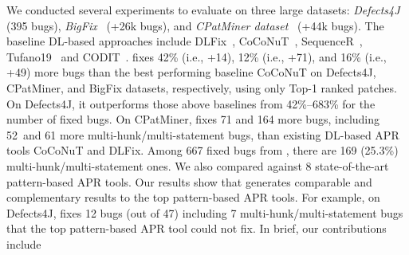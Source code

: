 
We conducted several experiments to evaluate {\tool} on three large
datasets: {\it Defects4J}~\cite{defects4j} (395 bugs), {\it
  BigFix}~\cite{icse20} (+26k bugs), and {\it CPatMiner
  dataset}~\cite{icse19-cpatminer} (+44k bugs). The baseline DL-based
approaches include DLFix~\cite{icse20},
CoCoNuT~\cite{lutellier2020coconut},
SequenceR~\cite{chen2018sequencer}, Tufano19~\cite{tufano2019learning}
and CODIT~\cite{chakrabortycodit}.
%
{\tool} fixes 42\% (i.e., +14), 12\% (i.e., +71), and 16\% (i.e., +49)
more bugs than the best performing baseline CoCoNuT on Defects4J,
CPatMiner, and BigFix datasets, respectively, using only Top-1 ranked
patches. On Defects4J, it outperforms those above baselines from
42\%--683\% for the number of fixed bugs.
%
On CPatMiner, {\tool} fixes 71 and 164 more bugs, including 52~and 61
more multi-hunk/multi-statement bugs, than existing DL-based APR tools
CoCoNuT and DLFix. Among 667 fixed bugs from {\tool}, there are 169
(25.3\%) multi-hunk/multi-statement ones.
%
%
We also compared {\tool} against 8 state-of-the-art pattern-based
APR tools. Our results show that {\tool} generates comparable and
complementary results to the top pattern-based APR tools. For example,
on Defects4J, {\tool} fixes 12 bugs (out of 47) including 7
multi-hunk/multi-statement bugs that the top pattern-based APR tool
could not fix.
%
In brief, our contributions include
  
